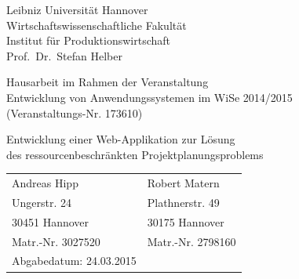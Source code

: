 \documentclass[a4paper,12pt,parskip,bibtotoc,liststotoc]{article}
\begin{document}
%
%
\thispagestyle{empty}  %
Leibniz Universität Hannover\\
Wirtschaftswissenschaftliche Fakultät\\
Institut für Produktionswirtschaft\\
Prof.\ Dr.\ Stefan Helber

\vspace{5cm}

\begin{center}
Hausarbeit im Rahmen der Veranstaltung \\
Entwicklung von Anwendungssystemen  im WiSe 2014/2015 \\
(Veranstaltungs-Nr. 173610)

\vspace{2.5cm}

{\Large Entwicklung einer Web-Applikation zur Lösung  \\
des ressourcenbeschränkten Projektplanungsproblems}
\end{center}

\vspace{5.5cm}


\begin{table}[h!]
    \vspace*{-3mm}
    \hspace*{2mm}
  \renewcommand{\arraystretch}{1,5}
    \begin{tabular}{ll}
Andreas Hipp &Robert Matern \\
Ungerstr. 24&Plathnerstr. 49 \\
30451 Hannover&30175 Hannover \\
Matr.-Nr. 3027520 &Matr.-Nr. 2798160 \\[3mm]
Abgabedatum: 24.03.2015
	\end{tabular}
\end{table}

\newpage

\tableofcontents

\newpage  %

\listoffigures
\end{document}
